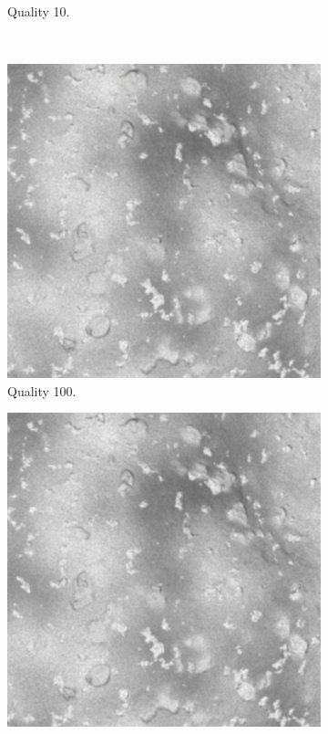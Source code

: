 \begin{figure}[htb]
\begin{subfigure}[b]{0.47\textwidth}
            \caption{Quality 10.}
            \label{fig:img_quality_10}
        \end{subfigure}
        \\
        \begin{subfigure}[b]{0.47\textwidth}
            \centering
                \includegraphics[width=\textwidth]{doc/thesis/0_figures/quality_compare/jp2_100_center.png}
            \caption{Quality 100.}
            \label{fig:img_quality_100}
        \end{subfigure}
        \begin{subfigure}[b]{0.47\textwidth}
            \centering
                \includegraphics[width=\textwidth]{doc/thesis/0_figures/quality_compare/jp2_1000_center.png}

\end{subfigure}
\end{figure}
